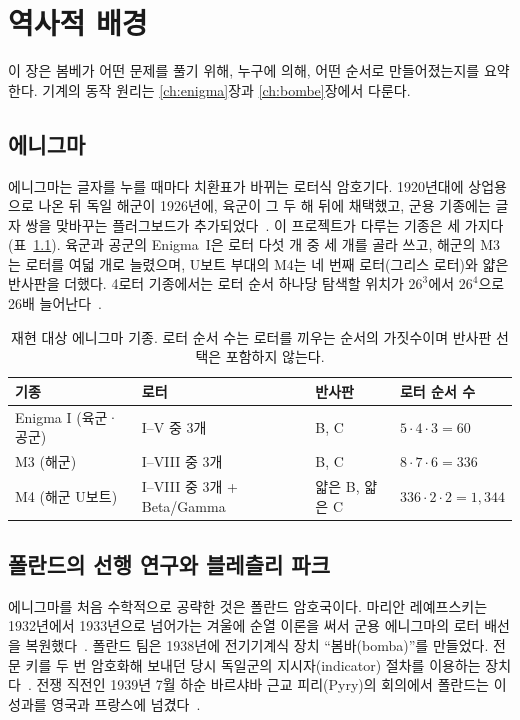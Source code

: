 \chapter{역사적 배경}\label{ch:history}

이 장은 봄베가 어떤 문제를 풀기 위해, 누구에 의해, 어떤 순서로 만들어졌는지를 요약한다.
기계의 동작 원리는 \ref{ch:enigma}장과 \ref{ch:bombe}장에서 다룬다.

\section{에니그마}

에니그마는 글자를 누를 때마다 치환표가 바뀌는 로터식 암호기다. 1920년대에 상업용으로 나온 뒤 독일 해군이
1926년에, 육군이 그 두 해 뒤에 채택했고, 군용 기종에는 글자 쌍을 맞바꾸는 플러그보드가
추가되었다~\cite{jackson-bh02,cryptomuseum-enigma-history}.
이 프로젝트가 다루는 기종은 세 가지다(표~\ref{tab:models}). 육군과 공군의 Enigma~I은 로터 다섯 개 중
세 개를 골라 쓰고, 해군의 M3는 로터를 여덟 개로 늘렸으며, U보트 부대의 M4는 네 번째 로터(그리스 로터)와
얇은 반사판을 더했다. 4로터 기종에서는 로터 순서 하나당 탐색할 위치가 $26^3$에서 $26^4$으로 26배
늘어난다~\cite{wenger1944history}.

\begin{table}[ht]
\centering
\caption{재현 대상 에니그마 기종. 로터 순서 수는 로터를 끼우는 순서의 가짓수이며 반사판 선택은 포함하지 않는다.}
\label{tab:models}
\begin{tabular}{llll}
\toprule
기종 & 로터 & 반사판 & 로터 순서 수 \\
\midrule
Enigma I (육군·공군) & I--V 중 3개 & B, C & $5\cdot4\cdot3 = 60$ \\
M3 (해군) & I--VIII 중 3개 & B, C & $8\cdot7\cdot6 = 336$ \\
M4 (해군 U보트) & I--VIII 중 3개 + Beta/Gamma & 얇은 B, 얇은 C & $336\cdot 2\cdot 2 = 1{,}344$ \\
\bottomrule
\end{tabular}
\end{table}

\section{폴란드의 선행 연구와 블레츨리 파크}

에니그마를 처음 수학적으로 공략한 것은 폴란드 암호국이다. 마리안 레예프스키는 1932년에서 1933년으로
넘어가는 겨울에 순열 이론을 써서 군용 에니그마의 로터 배선을
복원했다~\cite{rejewski1980application,welchman1986bomba}. 폴란드 팀은 1938년에 전기기계식 장치
``봄바(bomba)''를 만들었다. 전문 키를 두 번 암호화해 보내던 당시 독일군의 지시자(indicator) 절차를 이용하는
장치다~\cite{cryptomuseum-bombe,jackson-bh03}. 전쟁 직전인 1939년 7월 하순 바르샤바 근교 피리(Pyry)의
회의에서 폴란드는 이 성과를 영국과 프랑스에
넘겼다~\cite{rejewski1980application,gchq-pyry2020}.

